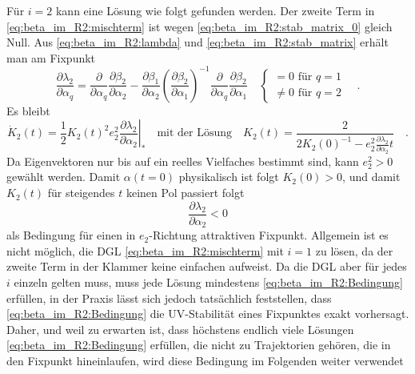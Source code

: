     Für $i=2$ kann eine Lösung wie folgt gefunden werden. Der zweite Term in 
    \eqref{eq:beta_im_R2:mischterm} ist wegen 
    \eqref{eq:beta_im_R2:stab_matrix_0} gleich Null.
    Aus \eqref{eq:beta_im_R2:lambda} und \eqref{eq:beta_im_R2:stab_matrix} 
    erhält man am Fixpunkt
    \begin{equation}
     \frac{\partial \lambda_2}{\partial \alpha_q} = 
     \frac{\partial}{\partial \alpha_q} 
     \frac{\partial \beta_2}{\partial \alpha_2} -
     \frac{\partial \beta_1}{\partial \alpha_2} 
     \left(\frac{\partial \beta_2}{\partial \alpha_1} \right)^{-1}
     \frac{\partial}{\partial \alpha_q} 
     \frac{\partial \beta_2}{\partial \alpha_1} \quad 
         \begin{cases}
     =0 \text{ für }q=1\\
     \neq 0 \text{ für }q=2 
   \end{cases}
   \quad .
    \end{equation}
    Es bleibt 
    \begin{equation}
     \dot{K}_2(t) =\frac12 K_2(t)^2  e_2^2 
     \left. \frac{\partial \lambda_2}{\partial \alpha_2} \right|_* \quad 
   \text{mit der Lösung} \quad 
     K_2(t) = \frac{2}{2 K_2(0)^{-1} - 
     e_2^2 \frac{\partial \lambda_2}{\partial \alpha_2}t } \quad .
    \end{equation}
    Da Eigenvektoren nur bis auf ein reelles Vielfaches bestimmt sind, kann 
    $e_2^2>0$ gewählt werden. Damit $\alpha(t=0)$ physikalisch ist folgt 
    $K_2(0)>0$, und damit $K_2(t)$ für steigendes $t$ keinen Pol passiert folgt 
    \begin{equation}
     \frac{\partial \lambda_2}{\partial \alpha_2} < 0
     \label{eq:beta_im_R2:Bedingung}
    \end{equation}
    als Bedingung für einen in $e_2$-Richtung attraktiven Fixpunkt.
    Allgemein ist es nicht möglich, die DGL \eqref{eq:beta_im_R2:mischterm} 
    mit $i=1$ zu lösen, da der zweite Term in der Klammer keine einfachen 
    aufweist. Da die DGL aber für jedes $i$ einzeln gelten muss, muss jede 
    Lösung mindestens \eqref{eq:beta_im_R2:Bedingung} erfüllen, in der Praxis 
    lässt sich jedoch tatsächlich feststellen, dass 
    \eqref{eq:beta_im_R2:Bedingung} die UV-Stabilität eines Fixpunktes exakt 
    vorhersagt. Daher, und weil zu erwarten ist, dass höchstens endlich viele 
    Lösungen \eqref{eq:beta_im_R2:Bedingung} erfüllen, die nicht zu 
    Trajektorien gehören, die in den Fixpunkt hineinlaufen, 
    wird diese Bedingung im Folgenden weiter verwendet

